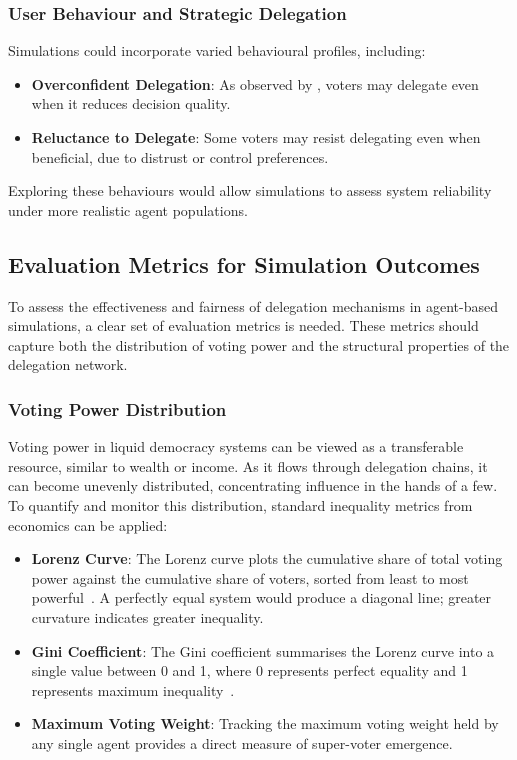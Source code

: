 \subsubsection{User Behaviour and Strategic Delegation}

Simulations could incorporate varied behavioural profiles, including:

\begin{itemize}
    \item \textbf{Overconfident Delegation}: As observed by \citet{casella_2022}, voters may delegate even when it reduces decision quality.
    \item \textbf{Reluctance to Delegate}: Some voters may resist delegating even when beneficial, due to distrust or control preferences.
\end{itemize}

Exploring these behaviours would allow simulations to assess system reliability under more realistic agent populations.

\subsection{Evaluation Metrics for Simulation Outcomes}

To assess the effectiveness and fairness of delegation mechanisms in agent-based simulations, a clear set of evaluation metrics is needed. These metrics should capture both the distribution of voting power and the structural properties of the delegation network.

\subsubsection{Voting Power Distribution}

Voting power in liquid democracy systems can be viewed as a transferable resource, similar to wealth or income. As it flows through delegation chains, it can become unevenly distributed, concentrating influence in the hands of a few. To quantify and monitor this distribution, standard inequality metrics from economics can be applied:

\begin{itemize}
    \item \textbf{Lorenz Curve}: The Lorenz curve plots the cumulative share of total voting power against the cumulative share of voters, sorted from least to most powerful~\citep{cowell_measuring_inequality}. A perfectly equal system would produce a diagonal line; greater curvature indicates greater inequality.
    \item \textbf{Gini Coefficient}: The Gini coefficient summarises the Lorenz curve into a single value between 0 and 1, where 0 represents perfect equality and 1 represents maximum inequality~\citep{cowell_measuring_inequality}.
    \item \textbf{Maximum Voting Weight}: Tracking the maximum voting weight held by any single agent provides a direct measure of super-voter emergence.
\end{itemize}

